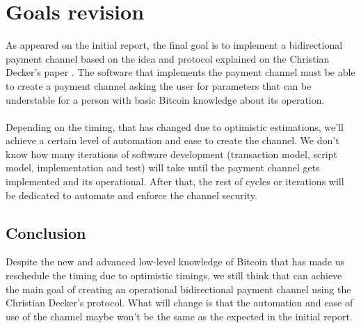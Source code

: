 \chapter*{Goals revision}
\label{chap:goals-revision}
As appeared on the initial report, the final goal is to implement a bidirectional payment channel based on the idea and protocol explained on the Christian Decker's paper \cite{decker2015fast}. The software that implements the payment channel must be able to create a payment channel asking the user for parameters that can be understable for a person with basic Bitcoin knowledge about its operation.\\\\
Depending on the timing, that has changed due to optimistic estimations, we'll achieve a certain level of automation and ease to create the channel. We don't know how many iterations of software development (transaction model, script model, implementation and test) will take until the payment channel gets implemented and its operational. After that, the rest of cycles or iterations will be dedicated to automate and enforce the channel security. 

\section{Conclusion}
Despite the new and advanced low-level knowledge of Bitcoin that has made us reschedule the timing due to optimistic timings, we still think that can achieve the main goal of creating an operational bidirectional payment channel using the Christian Decker's protocol. What will change is that the automation and ease of use of the channel maybe won't be the same as the expected in the initial report.